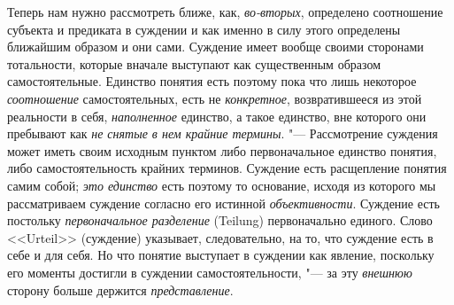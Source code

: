 Теперь нам нужно рассмотреть ближе, как,
{\em во-вторых},
определено соотношение субъекта и предиката в суждении и как
именно в силу этого определены ближайшим образом и они сами. Суждение имеет
вообще своими сторонами тотальности, которые вначале выступают как
существенным образом самостоятельные. Единство понятия есть поэтому пока
что лишь некоторое {\em соотношение}
самостоятельных, есть не
{\em конкретное},
возвратившееся из этой реальности в себя,
{\em наполненное}
единство, а такое единство, вне которого они пребывают
как {\em не снятые в нем
крайние термины}. "--- Рассмотрение суждения может иметь своим
исходным пунктом либо первоначальное единство понятия, либо
самостоятельность крайних терминов. Суждение есть расщепление понятия самим
собой; {\em это единство}
есть поэтому то основание, исходя из которого мы
рассматриваем суждение согласно его истинной
{\em объективности}.
Суждение есть постольку
{\em первоначальное разделение}
(Teilung) первоначально единого. Слово <<Urteil>> (суждение)
указывает, следовательно, на то, что суждение есть в себе и для себя. Но
что понятие выступает в суждении как явление, поскольку его моменты
достигли в суждении самостоятельности, "--- за эту
{\em внешнюю} сторону
больше держится {\em представление}.

